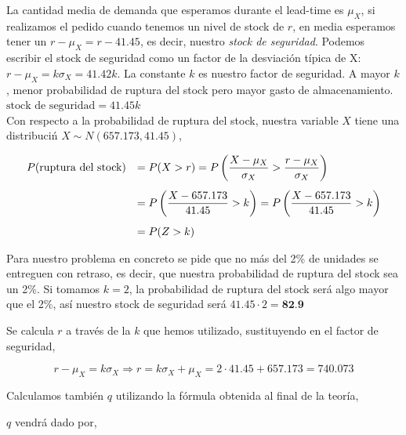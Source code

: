 \documentclass[a4paper,12pt]{article}
\begin{document}
La cantidad media de demanda que esperamos durante el lead-time es $\mu_X$, si realizamos el pedido cuando tenemos un nivel de stock de $r$, en media esperamos tener un $r - \mu_X = r - 41.45$, es decir, nuestro \textit{stock de seguridad}. Podemos escribir el stock de seguridad como un factor de la desviaci\'on t\'ipica de X: $r - \mu_X = k\sigma_X =  41.42 k$. La constante $k$ es nuestro factor de seguridad. A mayor $k$, menor probabilidad de ruptura del stock pero mayor gasto de almacenamiento. \\

$ \text{stock de seguridad} = 41.45 k$\\

Con respecto a la probabilidad de ruptura del stock, nuestra variable $X$ tiene una distribuci\'n $ X\sim N(657.173, 41.45)$,

\begin{equation*}
\begin{array}{l l}
 P(\text{ruptura del stock}) & =  P(X > r) = P\left(\dfrac{X - \mu_X}{\sigma_X} > \dfrac{r-\mu_X}{\sigma_X}\right) \\[0.5cm]
 \, &   = P\left(\dfrac{X - 657.173}{41.45} > k\right) = P\left(\dfrac{X - 657.173}{41.45} > k\right) \\[0.5cm]
 \, &   = P(Z > k)
\end{array}
\end{equation*}

Para nuestro problema en concreto se pide que no m\'as del 2\% de unidades se entreguen con retraso, es decir, que nuestra probabilidad de ruptura del stock sea un 2\%. Si tomamos $k = 2$, la probabilidad de ruptura del stock ser\'a algo mayor que el 2\%, as\'i nuestro stock de seguridad ser\'a $41.45 \cdot 2 = \textbf{82.9}$

Se calcula \textbf{$r$} a trav\'es de la $k$ que hemos utilizado, sustituyendo en el factor de seguridad,

$$ r - \mu_X = k\sigma_X \Rightarrow r = k\sigma_X + \mu_X = 2\cdot 41.45 + 657.173 = 740.073$$


Calculamos tambi\'en $q$ utilizando la f\'ormula obtenida al final de la teor\'ia,

$q$ vendr\'a dado por,
\end{document}
